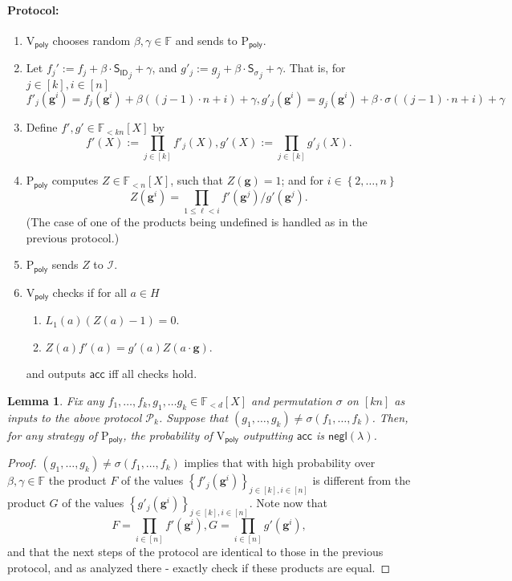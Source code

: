 \documentclass[11pt]{article} %
\newcommand{\F}{\ensuremath{\mathbb F}\xspace}
\newcommand{\sigof}[1]{\ensuremath{\sigma(#1)}\xspace}
\newcommand{\proverexp}{\ensuremath{\mathsf{e}}\xspace}
\newcommand{\negl}{\ensuremath{\mathsf{negl}(\lambda)}\xspace}
\newcommand{\acc}{\ensuremath{\mathsf{acc}}\xspace}
\newcommand{\defeq}{:=}
\newcommand{\dom}{\ensuremath{H}\xspace}
\newcommand{\sett}[2]{\ensuremath{\set{#1}_{#2}}\xspace}
\newcommand{\prvpoly}{\ensuremath{\mathrm{P_{\mathsf{poly}}}}\xspace}
\newcommand{\verpoly}{\ensuremath{\mathrm{V_{\mathsf{poly}}}}\xspace}
\newcommand{\ideal}{\ensuremath{\mathcal{I}}\xspace}
\newcommand{\set}[1]{\ensuremath{\left\{#1\right\}}\xspace}
\newcommand{\hgen}{\ensuremath{\mathbf{g}}\xspace}
\newcommand{\polysofdeg}[1]{\ensuremath{\F_{< #1}[X]}\xspace}
\newcommand{\prot}{\ensuremath{\mathscr{P}}\xspace}
\newcommand{\sigpoly}{\ensuremath{\mathsf{S_{\sigma}}}\xspace}
\newcommand{\idpoly}{\ensuremath{\mathsf{S_{ID}}}\xspace}
\newtheorem{lemma}{Lemma}[section]
\newcommand{\protmany}{\ensuremath{ {\prot}_k}\xspace}
\begin{document}
\paragraph{Protocol:}
\begin{enumerate}
 \item\label{item:betgamma} \verpoly chooses random $\beta,\gamma \in\F$ and sends to \prvpoly.
 \item Let $f_j'\defeq f_j+\beta\cdot  \idpoly_j +\gamma$, and $ g'_j\defeq g_j+\beta\cdot \sigpoly_j + \gamma$.
That is, for $j\in [k],i\in [n]$
 \[f'_j(\hgen^i) = f_j(\hgen^i) + \beta((j-1)\cdot n + i) + \gamma,
 g'_j(\hgen^i) = g_j(\hgen^i) + \beta\cdot \sigma((j-1)\cdot n + i) + \gamma\]
\item Define $f',g' \in \polysofdeg{kn}$ by 
\[f'(X) \defeq \prod_{j\in [k]} f'_j(X),g'(X) \defeq \prod_{j\in [k]} g'_j(X).\]
 
 \item \prvpoly computes $Z \in \polysofdeg{n}$, such that 
 $Z(\hgen) =1$; and for $i\in \set{2,\ldots,n}$
 \[Z(\hgen^i)  = \prod_{1\leq \ell <i} f'(\hgen^j)/g'(\hgen^j).\]
 (The case of one of the products being undefined is handled as in the previous protocol.)
 
 
 \item \prvpoly sends $Z$ to \ideal.
 \item \verpoly checks if for all $a\in \dom$
 \begin{enumerate}
  \item $L_1(a) (Z(a)-1) =0$.
  \item $Z(a)f'(a) = g'(a)Z(a\cdot \hgen)$.
 \end{enumerate}
 and outputs \acc iff all checks hold.
\end{enumerate}
\begin{lemma}\label{lem:permprotocolmany}
Fix any $f_1,\ldots,f_k,g_1,\ldots g_k \in \polysofdeg{d}$ and permutation $\sigma$ on $[kn]$ as inputs to the above protocol \protmany.
Suppose that $(g_1,\ldots,g_k) \neq \sigof{f_1,\ldots,f_k}$.
Then, for any strategy of \prvpoly, the probability of \verpoly outputting \acc is \negl.

\end{lemma}
\begin{proof}
 $(g_1,\ldots,g_k) \neq \sigof{f_1,\ldots,f_k}$ implies that with high probability over $\beta,\gamma \in \F$ the product $F$ of the values 
 \sett{f'_j(\hgen^i)}{j\in [k],i\in [n]} is different from the product $G$ of the values
 \sett{g'_j(\hgen^i)}{j\in [k],i\in [n]}.
 Note now that 
    \[F=\prod_{i\in [n]} f'(\hgen^i), G=\prod_{i\in [n]} g'(\hgen^i),\]
 and that the next steps of the protocol are identical to those in the previous protocol,
 and as analyzed there - exactly check if these products are equal.
\end{proof}
\end{document}
